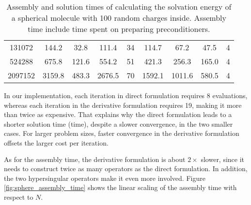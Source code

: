 \begin{table*}[]
\begin{tabular}{c|cccc|cccc}
    131072                                                       & 144.2                                                    & 32.8                                                        & 111.4                                                    & 34            & 114.7                                                    & 67.2                                                        & 47.5                                                     & 4            \\
    524288                                                       & 675.8                                                    & 121.6                                                       & 554.2                                                    & 51            & 421.3                                                    & 256.3                                                       & 165.0                                                    & 4            \\
    2097152                                                      & 3159.8                                                   & 483.3                                                       & 2676.5                                                   & 70            & 1592.1                                                   & 1011.6                                                      & 580.5                                                    & 4           
    \end{tabular}
    \caption{Assembly and solution times of calculating the solvation energy of a spherical molecule with 100 random charges inside.
    Assembly time include time spent on preparing preconditioners.}
    \label{tab:sphere_time}
\end{table*}

In our implementation, each iteration in direct formulation requires $8$ \fmm evaluations, whereas each iteration in the derivative formulation requires 19, making it more than twice as expensive.
That explains why the direct formulation leads to a shorter solution time (\gmres time), despite a slower convergence, in the two smaller cases.
For larger problem sizes, faster convergence in the derivative formulation offsets the larger cost per iteration.

As for the assembly time, the derivative formulation is about $2\times$ slower, since it needs to construct twice as many operators as the direct formulation.
In addition, the two hypersingular operators make it even more involved.
Figure \ref{fig:sphere_assembly_time} shows the linear scaling of the assembly time with respect to $N$.

